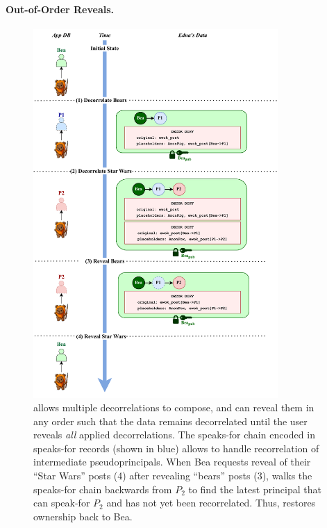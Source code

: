 \paragraph{Out-of-Order Reveals.}
\label{s:design:oooreveals}

\begin{figure}
\centering
    \includegraphics[width=0.83\textwidth]{figs/composition}
    \caption[Decorrelations can compose and be revealed in any order.]
    {\sys allows multiple decorrelations to compose, and can reveal them in
    any order such that the data remains decorrelated until the user reveals \emph{all}
    applied decorrelations. The speaks-for chain encoded in
    speaks-for records (shown in blue) allows \sys to handle recorrelation of intermediate
    pseudoprincipals. When Bea requests reveal of their ``Star Wars''
    posts (4) after revealing ``bears'' posts (3), \sys walks the speaks-for chain
    backwards from $P_2$ to find the latest principal that can speak-for $P_2$
    and has not yet been recorrelated. Thus, \sys restores ownership back to
    Bea.}
\label{f:composition-desn}
\end{figure}


